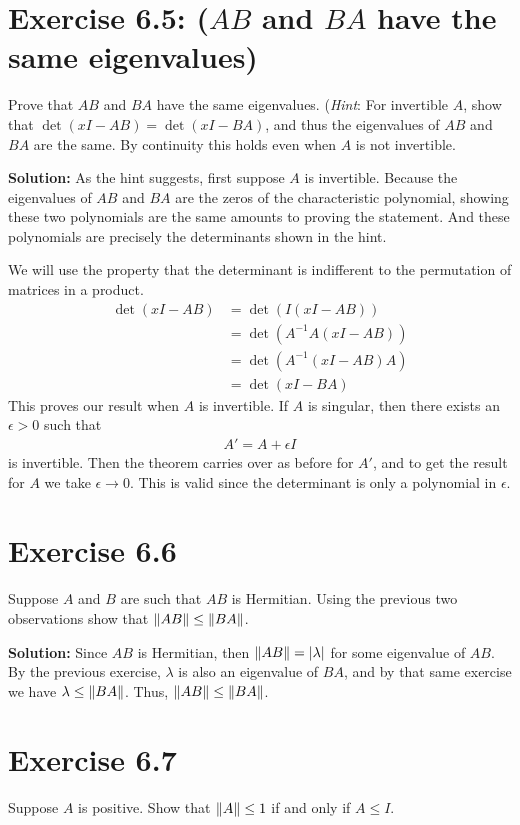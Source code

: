 \documentclass{book}
\begin{document}
\section*{Exercise 6.5: ($AB$ and $BA$ have the same eigenvalues)}
    Prove that $AB$ and $BA$ have the same eigenvalues. (\emph{Hint}: For invertible $A$, show that $\det(xI-AB) = \det(xI-BA)$, and thus the eigenvalues of $AB$ and $BA$ are the same. By continuity this holds even when $A$ is not invertible.
    
    \textbf{Solution:} As the hint suggests, first suppose $A$ is invertible. Because the eigenvalues of $AB$ and $BA$ are the zeros of the characteristic polynomial, showing these two polynomials are the same amounts to proving the statement. And these polynomials are precisely the determinants shown in the hint. 
    
    We will use the property that the determinant is indifferent to the permutation of matrices in a product.
    \begin{align}
        \det(xI-AB) &= \det(I(xI-AB)) \\
        &= \det(A^{-1}A(xI-AB)) \\
        &= \det(A^{-1}(xI-AB)A) \\
        &= \det(xI-BA)
    \end{align}
    This proves our result when $A$ is invertible. If $A$ is singular, then there exists an $\epsilon>0$ such that
    \begin{align}
        A' = A + \epsilon I 
    \end{align}
    is invertible. Then the theorem carries over as before for $A'$, and to get the result for $A$ we take $\epsilon\rightarrow 0$. This is valid since the determinant is only a polynomial in $\epsilon$.
    
\section*{Exercise 6.6}
    Suppose $A$ and $B$ are such that $AB$ is Hermitian. Using the previous two observations show that $\norm{AB}\leq\norm{BA}$.
    
    \textbf{Solution:} Since $AB$ is Hermitian, then $\norm{AB} = \abs{\lambda}$ for some eigenvalue of $AB$. By the previous exercise, $\lambda$ is also an eigenvalue of $BA$, and by that same exercise we have $\lambda \leq \norm{BA}$. Thus, $\norm{AB}
    \leq\norm{BA}$.
    
\section*{Exercise 6.7}
    Suppose $A$ is positive. Show that $\norm{A}\leq 1$ if and only if $A \leq I$.
    
\end{document}
